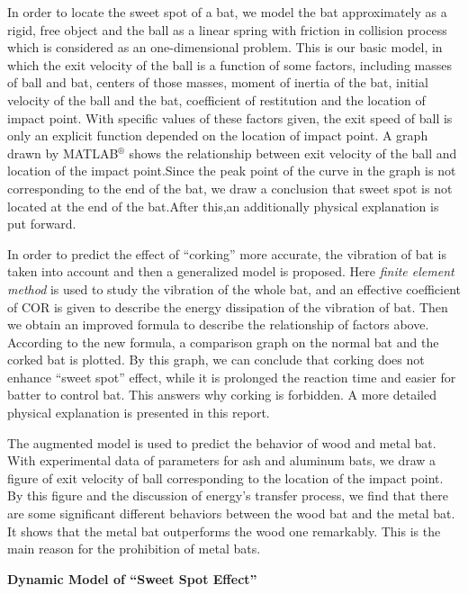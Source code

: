 \documentclass[12pt]{article}
\begin{document}
In order to locate the sweet spot of a bat, we
model the bat approximately as a rigid, free object and
the ball as a linear spring with friction in collision process
which is considered as an one-dimensional problem. This
is our basic model, in which the exit velocity of the ball is
a function of some factors, including masses of ball and
bat, centers of those masses, moment of inertia of the bat, initial
velocity of the ball and the bat, coefficient of restitution
and the location of impact point.
With specific values of these factors given, the exit speed
of ball is only an explicit function depended on the
location of impact point. A graph drawn by MATLAB$^\circledR$ shows the relationship between exit velocity of the ball and location of the impact point.Since the peak point of the curve in the graph is not corresponding to the end of the bat, we draw a conclusion that sweet spot is not located at the end of the bat.After this,an additionally physical explanation is put forward.

In order to predict the effect of ``corking'' more accurate, the vibration of bat is taken into account and then a generalized model is proposed. Here \emph{finite element method} is used to study the vibration of the whole bat, and an effective coefficient of COR is given to describe the energy dissipation of the vibration of bat. Then we obtain an improved formula to describe the relationship of factors above. According to the new formula, a comparison graph on the normal bat and the corked bat is plotted. By this graph, we can conclude that corking does not enhance ``sweet spot'' effect, while it is prolonged the reaction time and easier for batter to control bat. This answers why corking is forbidden. A more detailed physical explanation is presented in this report.

The augmented model is used to predict the behavior of wood and metal bat. With experimental data of parameters for ash and aluminum bats, we draw a figure of exit velocity of ball corresponding to the location of the impact point. By this figure and the discussion of energy's transfer process, we find that there are some significant different behaviors between the wood bat and the metal bat. It shows that the metal bat outperforms the wood one remarkably. This is the main reason for the prohibition of metal bats.

\newpage

\thispagestyle{empty}
\setcounter{page}{0}
{\begin{center}\Large \textbf{Dynamic Model of ``Sweet Spot Effect''}\end{center}}
\tableofcontents                                                  %
\newpage                                                          %
\end{document}
